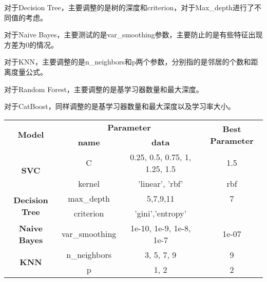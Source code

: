 \documentclass[../main.tex]{subfiles}
\begin{document}
        对于Decision Tree，主要调整的是树的深度和criterion，对于Max\_depth进行了不同值的考虑。

        对于Naive Bayes，主要测试的是var\_smoothing参数，主要防止的是有些特征出现方差为0的情况。

        对于KNN，主要调整的是n\_neighbors和p两个参数，分别指的是邻居的个数和距离度量公式。

        对于Random Forest，主要调整的是基学习器数量和最大深度。

        对于CatBoost，同样调整的是基学习器数量和最大深度以及学习率大小。

        \begin{table}[H]
            \centering
            \small
            \begin{tabular}{|c|cc|c|}
            \hline
            \multirow{2}{*}{\textbf{Model}}         & \multicolumn{2}{c|}{\textbf{Parameter}}                             & \multirow{2}{*}{\textbf{Best Parameter}} \\ \cline{2-3}
                                                    & \multicolumn{1}{c|}{\textbf{name}}  & \textbf{data}                 &                                          \\ \hline
            \multirow{2}{*}{\textbf{SVC}}           & \multicolumn{1}{c|}{C}              & 0.25, 0.5, 0.75, 1, 1.25, 1.5 & 1.5                                      \\ \cline{2-4} 
                                                    & \multicolumn{1}{c|}{kernel}         & 'linear', 'rbf'               & rbf                                      \\ \hline
            \multirow{2}{*}{\textbf{Decision Tree}} & \multicolumn{1}{c|}{max\_depth}     & 5,7,9,11                      & 7                                        \\ \cline{2-4} 
                                                    & \multicolumn{1}{c|}{criterion}      & 'gini','entropy'              &                                          \\ \hline
            \textbf{Naive Bayes}                    & \multicolumn{1}{c|}{var\_smoothing} & 1e-10, 1e-9, 1e-8, 1e-7       & 1e-07                                    \\ \hline
            \multirow{2}{*}{\textbf{KNN}}           & \multicolumn{1}{c|}{n\_neighbors}   & 3, 5, 7, 9                    & 9                                        \\ \cline{2-4} 
                                                    & \multicolumn{1}{c|}{p}              & 1, 2                          & 2                                        \\ \hline

\end{tabular}
\end{table}
\end{document}
